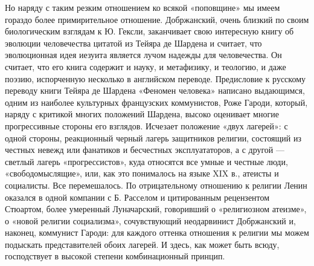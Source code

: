 Но наряду с таким резким отношением ко всякой «поповщине» мы имеем гораздо
более примирительное отношение. Добржанский, очень близкий по своим
биологическим взглядам к Ю. Гексли, заканчивает свою интересную книгу об
эволюции человечества цитатой из Тейяра де Шардена и считает, что эволюционная
идея иезуита является лучом надежды для человечества. Он считает, что его книга
содержит и науку, и метафизику, и теологию, и даже поэзию, испорченную
несколько в английском переводе. Предисловие к русскому переводу
книги Тейяра де Шардена «Феномен человека» написано выдающимся, одним из
наиболее культурных французских коммунистов, Роже Гароди, который, наряду с
критикой многих положений Шардена, высоко оценивает многие прогрессивные
стороны его взглядов. Исчезает положение «двух лагерей»: с одной стороны,
реакционный черный лагерь защитников религии, состоящий из честных невежд или
фанатиков и бесчестных эксплуататоров, а с другой --- светлый лагерь
«прогрессистов», куда относятся все умные и честные люди, «свободомыслящие»,
или, как это понималось на языке XIX в., атеисты и социалисты. Все
перемешалось. По отрицательному отношению к религии Ленин оказался в одной
компании с Б. Расселом и цитированным рецензентом Стюартом, более умеренный
Луначарский, говоривший о «религиозном атеизме», о «новой религии социализма»,
сочувствующий неодарвинист Добржанский и, наконец, коммунист Гароди: для
каждого оттенка отношения к религии мы можем подыскать представителей обоих
лагерей. И здесь, как может быть всюду, господствует в высокой степени
комбинационный принцип.

